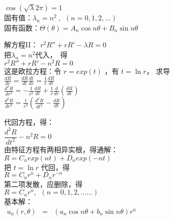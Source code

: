 \begin{frame}
	$\cos (\sqrt {\lambda} 2\pi)=1$   \\ 	
	固有值：$\lambda _n =n^2 ~,~~ (n=0,1,2,...)$  \\ 
	固有函数：$\displaystyle  \Theta(\theta)=A_n\cos n \theta +B_n \sin n \theta $\\   \vspace{0.6cm}

	解方程II：
	{$\displaystyle  r^2 R'' +r R' -\lambda R =0 $  } \\ 
	把$\lambda_n =n^2 $代入， 得 \\ 
	{$\displaystyle  r^2 R'' +r R' -n^2R =0 $  } \\ 
	这是欧拉方程：令 $ r=exp(t) $ ，有 $t=\ln r$， 求导 \\ 
	$ \displaystyle \frac{dR}{dr} =\frac{dR}{dt} \frac{dt}{dr} =\frac{1}{r} \frac{dR}{dt} $ \\ 
	$ \displaystyle \frac{d^2R}{dr^2} =-\frac{1}{r^2}\frac{dR}{dt} + \frac{1}{r} \frac{d}{dr} (\frac{dR}{dt} )$ \\ 
	$ \displaystyle \frac{d^2R}{dr^2} =\frac{1}{r^2} (\frac{d^2R}{dt^2}-\frac{dR}{dt} )$ \\ 		
\end{frame}	

\begin{frame}	
	代回方程，得：\\ 
	$ \displaystyle   \dfrac{d^2R}{dt^2} -n^2 R =0 $ \\ 
	由特征方程有两相异实根，得通解：\\ 
	$ R=C_nexp(nt)+D_n exp(-nt) $\\
	把 $t=\ln r$ 代回，得\\
	$R=C_n r^n +D_nr^{-n}$ \\ 
	第二项发散，应删除，得\\
	$R= C_n r^n,  ~~ (n=0,1,2,......) $		\\
	基本解：\\ 
	$\begin{array}{llll}
		u_n(r,\theta) &=& (a_n\cos n\theta +b_n \sin n \theta ) r^n  \\ 
	\end{array}$ \\ 	
\end{frame}	

